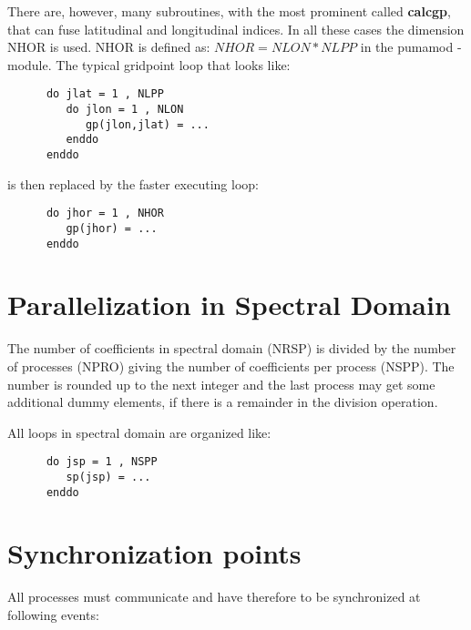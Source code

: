 There are, however, many subroutines, with the most prominent
called {\bf calcgp}, that can fuse latitudinal and longitudinal
indices. In all these cases the dimension NHOR is used.
NHOR is defined as: $NHOR = NLON * NLPP$ in the 
pumamod - module. The typical gridpoint loop that looks like:

\begin{verbatim}
      do jlat = 1 , NLPP
         do jlon = 1 , NLON
            gp(jlon,jlat) = ...
         enddo
      enddo
\end{verbatim}

is then replaced by the faster executing loop:

\begin{verbatim}
      do jhor = 1 , NHOR
         gp(jhor) = ...
      enddo
\end{verbatim}

\section{Parallelization in Spectral Domain}

The number of coefficients in spectral domain (NRSP)
is divided by the number of processes (NPRO) giving
the number of coefficients per process (NSPP).
The number is rounded up to the next integer and the
last process may get some additional dummy elements,
if there is a remainder in the division operation.

All loops in spectral domain are organized like:

\begin{verbatim}
      do jsp = 1 , NSPP
         sp(jsp) = ...
      enddo
\end{verbatim}

\section{Synchronization points}

All processes must communicate and have therefore to
be synchronized at following events:

